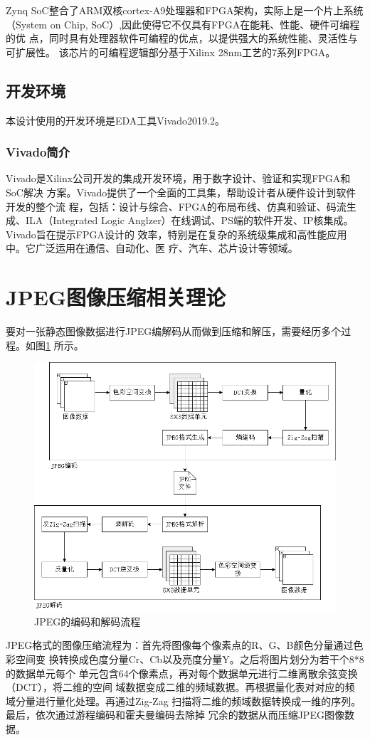 \documentclass{article}
\numberwithin {equation}{section}
\begin{document}
\begin{spacing}{1.25}
    Zynq SoC整合了ARM双核cortex-A9处理器和FPGA架构，实际上是一个片上系统
    （System on Chip, SoC）,因此使得它不仅具有FPGA在能耗、性能、硬件可编程的优
    点，同时具有处理器软件可编程的优点，以提供强大的系统性能、灵活性与可扩展性。
    该芯片的可编程逻辑部分基于Xilinx 28nm工艺的7系列FPGA。
  \subsection{开发环境}
    本设计使用的开发环境是EDA工具Vivado2019.2。
    \subsubsection{Vivado简介}
    \vspace{1em}
      Vivado是Xilinx公司开发的集成开发环境，用于数字设计、验证和实现FPGA和SoC解决
      方案。Vivado提供了一个全面的工具集，帮助设计者从硬件设计到软件开发的整个流
      程，包括：设计与综合、FPGA的布局布线、仿真和验证、码流生成、ILA（Integrated
       Logic Anglzer）在线调试、PS端的软件开发、IP核集成。Vivado旨在提示FPGA设计的
       效率，特别是在复杂的系统级集成和高性能应用中。它广泛运用在通信、自动化、医
       疗、汽车、芯片设计等领域。

\newpage
\section{JPEG图像压缩相关理论}
  要对一张静态图像数据进行JPEG编解码从而做到压缩和解压，需要经历多个过程。如图\ref{jpeg}
  所示。
  \begin{figure}[H]
    \centering
    \includegraphics[scale=0.45]{./pictures/编解码流程.png}
    \caption{JPEG的编码和解码流程}\label{jpeg}
  \end{figure}
  JPEG格式的图像压缩流程为：首先将图像每个像素点的R、G、B颜色分量通过色彩空间变
  换转换成色度分量Cr、Cb以及亮度分量Y。之后将图片划分为若干个8*8的数据单元每个
  单元包含64个像素点，再对每个数据单元进行二维离散余弦变换（DCT），将二维的空间
  域数据变成二维的频域数据。再根据量化表对对应的频域分量进行量化处理。再通过Zig-Zag
  扫描将二维的频域数据转换成一维的序列。最后，依次通过游程编码和霍夫曼编码去除掉
  冗余的数据从而压缩JPEG图像数据。


\end{spacing}
\end{document}
